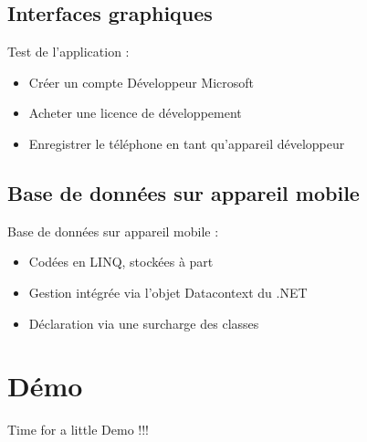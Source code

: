 \documentclass{beamer}
\begin{document}
\subsection{Interfaces graphiques}

\begin{frame}{Test de l’application :}
  \begin{itemize}
  \item {
    Créer un compte Développeur Microsoft
    \pause
  }
  \item {   
    Acheter une licence de développement
    \pause
  }
  \item {
    Enregistrer le téléphone en tant qu’appareil développeur
    \pause
  }
  \end{itemize}
\end{frame}

\subsection{Base de données sur appareil mobile}

\begin{frame}{Base de données sur appareil mobile :}
  \begin{itemize}
  \item {
    Codées en LINQ, stockées à part
    \pause
  }
  \item {   
    Gestion intégrée via l’objet Datacontext du .NET
    \pause
  }
  \item {
    Déclaration via une surcharge des classes
    \pause
  }
  \end{itemize}
\end{frame}

\section{Démo}
    \begin{frame}{}
    \LARGE Time for a little Demo !!!
    \end{frame}
\end{document}

